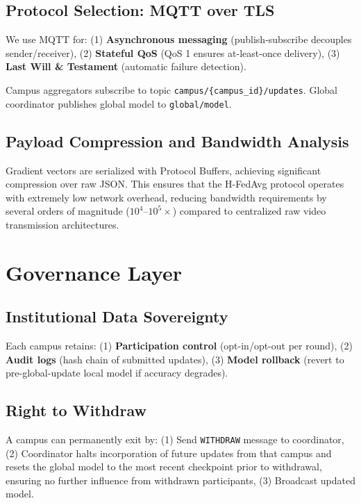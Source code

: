 \documentclass[conference]{IEEEtran}
\begin{document}
\subsection{Protocol Selection: MQTT over TLS}

We use MQTT for: (1) \textbf{Asynchronous messaging} (publish-subscribe decouples sender/receiver), (2) \textbf{Stateful QoS} (QoS 1 ensures at-least-once delivery), (3) \textbf{Last Will \& Testament} (automatic failure detection).

Campus aggregators subscribe to topic \texttt{campus/\{campus\_id\}/updates}. Global coordinator publishes global model to \texttt{global/model}.

\subsection{Payload Compression and Bandwidth Analysis}

Gradient vectors are serialized with Protocol Buffers, achieving significant compression over raw JSON. This ensures that the H-FedAvg protocol operates with extremely low network overhead, reducing bandwidth requirements by several orders of magnitude ($10^4$--$10^5\times$) compared to centralized raw video transmission architectures.

\section{Governance Layer}

\subsection{Institutional Data Sovereignty}

Each campus retains: (1) \textbf{Participation control} (opt-in/opt-out per round), (2) \textbf{Audit logs} (hash chain of submitted updates), (3) \textbf{Model rollback} (revert to pre-global-update local model if accuracy degrades).

\subsection{Right to Withdraw}

A campus can permanently exit by: (1) Send \texttt{WITHDRAW} message to coordinator, (2) Coordinator halts incorporation of future updates from that campus and resets the global model to the most recent checkpoint prior to withdrawal, ensuring no further influence from withdrawn participants, (3) Broadcast updated model.
\end{document}
